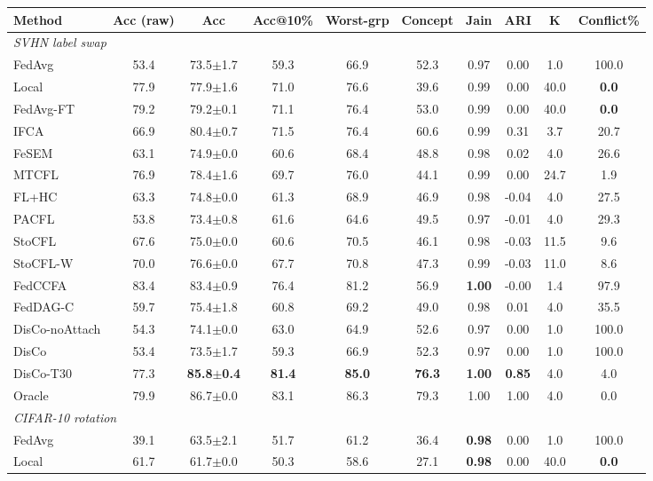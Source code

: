 \scriptsize
\setlength{\tabcolsep}{3.2pt}
\begin{tabular}{lccccccccc}
\toprule
Method & Acc (raw) & Acc & Acc@10\% & Worst-grp & Concept & Jain & ARI & K & Conflict\% \\
\midrule
\multicolumn{10}{l}{\textit{SVHN label swap}}\\
FedAvg & 53.4 & 73.5$\pm$1.7 & 59.3 & 66.9 & 52.3 & 0.97 & 0.00 & 1.0 & 100.0 \\
Local & 77.9 & 77.9$\pm$1.6 & 71.0 & 76.6 & 39.6 & 0.99 & 0.00 & 40.0 & \textbf{0.0} \\
FedAvg-FT & 79.2 & 79.2$\pm$0.1 & 71.1 & 76.4 & 53.0 & 0.99 & 0.00 & 40.0 & \textbf{0.0} \\
IFCA & 66.9 & 80.4$\pm$0.7 & 71.5 & 76.4 & 60.6 & 0.99 & 0.31 & 3.7 & 20.7 \\
FeSEM & 63.1 & 74.9$\pm$0.0 & 60.6 & 68.4 & 48.8 & 0.98 & 0.02 & 4.0 & 26.6 \\
MTCFL & 76.9 & 78.4$\pm$1.6 & 69.7 & 76.0 & 44.1 & 0.99 & 0.00 & 24.7 & 1.9 \\
FL+HC & 63.3 & 74.8$\pm$0.0 & 61.3 & 68.9 & 46.9 & 0.98 & -0.04 & 4.0 & 27.5 \\
PACFL & 53.8 & 73.4$\pm$0.8 & 61.6 & 64.6 & 49.5 & 0.97 & -0.01 & 4.0 & 29.3 \\
StoCFL & 67.6 & 75.0$\pm$0.0 & 60.6 & 70.5 & 46.1 & 0.98 & -0.03 & 11.5 & 9.6 \\
StoCFL-W & 70.0 & 76.6$\pm$0.0 & 67.7 & 70.8 & 47.3 & 0.99 & -0.03 & 11.0 & 8.6 \\
FedCCFA & 83.4 & 83.4$\pm$0.9 & 76.4 & 81.2 & 56.9 & \textbf{1.00} & -0.00 & 1.4 & 97.9 \\
FedDAG-C & 59.7 & 75.4$\pm$1.8 & 60.8 & 69.2 & 49.0 & 0.98 & 0.01 & 4.0 & 35.5 \\
DisCo-noAttach & 54.3 & 74.1$\pm$0.0 & 63.0 & 64.9 & 52.6 & 0.97 & 0.00 & 1.0 & 100.0 \\
DisCo & 53.4 & 73.5$\pm$1.7 & 59.3 & 66.9 & 52.3 & 0.97 & 0.00 & 1.0 & 100.0 \\
DisCo-T30 & 77.3 & \textbf{85.8$\pm$0.4} & \textbf{81.4} & \textbf{85.0} & \textbf{76.3} & \textbf{1.00} & \textbf{0.85} & 4.0 & 4.0 \\
Oracle & 79.9 & 86.7$\pm$0.0 & 83.1 & 86.3 & 79.3 & 1.00 & 1.00 & 4.0 & 0.0 \\
\midrule
\multicolumn{10}{l}{\textit{CIFAR-10 rotation}}\\
FedAvg & 39.1 & 63.5$\pm$2.1 & 51.7 & 61.2 & 36.4 & \textbf{0.98} & 0.00 & 1.0 & 100.0 \\
Local & 61.7 & 61.7$\pm$0.0 & 50.3 & 58.6 & 27.1 & \textbf{0.98} & 0.00 & 40.0 & \textbf{0.0} \\

\end{tabular}
